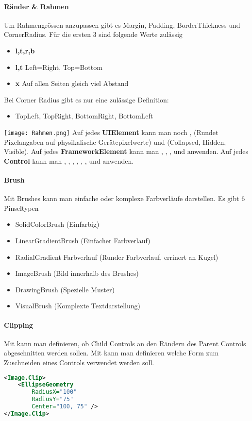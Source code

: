 \paragraph{Ränder \& Rahmen} Um Rahmengrössen anzupassen gibt es Margin, Padding, BorderThickness und CornerRadius. Für die ersten 3 sind folgende Werte zulässig
\begin{itemize}
\item \textbf{l,t,r,b}
\item \textbf{l,t} Left=Right, Top=Bottom
\item \textbf{x} Auf allen Seiten gleich viel Abstand
\end{itemize}
Bei Corner Radius gibt es nur eine zulässige Definition:
\begin{itemize}
\item TopLeft, TopRight, BottomRight, BottomLeft
\end{itemize}
\texttt{[image: Rahmen.png]}
Auf jedes \textbf{UIElement} kann man noch ,  (Rundet Pixelangaben auf physikalische Gerätepixelwerte) und  (Collapsed, Hidden, Visible). Auf jedes \textbf{FrameworkElement} kann man , , ,  und  anwenden. Auf jedes \textbf{Control} kann man , , , , , ,  und  anwenden.
\paragraph{Brush} Mit Brushes kann man einfache oder komplexe Farbverläufe darstellen. Es gibt 6 Pinseltypen
\begin{itemize}
\item SolidColorBrush (Einfarbig)
\item LinearGradientBrush (Einfacher Farbverlauf)
\item RadialGradient Farbverlauf (Runder Farbverlauf, errinert an Kugel)
\item ImageBrush (Bild innerhalb des Brushes)
\item DrawingBrush (Spezielle Muster)
\item VisualBrush (Komplexte Textdarstellung)
\end{itemize}
\paragraph{Clipping} Mit  kann man definieren, ob Child Controls an den Rändern des Parent Controls abgeschnitten werden sollen. Mit  kann man definieren welche Form zum Zuschneiden eines Controls verwendet werden soll.
\begin{lstlisting}[language=xml]
<Image.Clip>
    <EllipseGeometry
        RadiusX="100"
        RadiusY="75"
        Center="100, 75" />
</Image.Clip>
\end{lstlisting}
